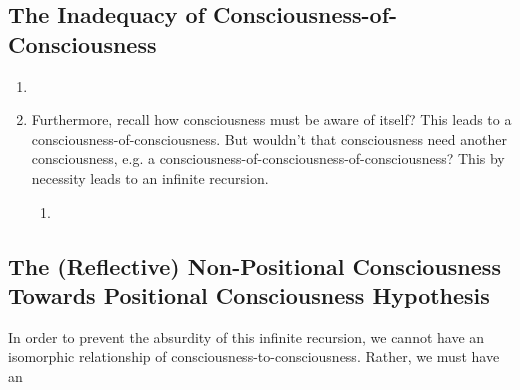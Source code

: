 \subsection{The Inadequacy of Consciousness-of-Consciousness}
\begin{enumerate}
  \item {}
  \item Furthermore, recall how consciousness must be aware of itself? This leads to a consciousness-of-consciousness. But wouldn't that consciousness need another consciousness, e.g. a consciousness-of-consciousness-of-consciousness? This by necessity leads to an infinite recursion.
  \begin{enumerate}
    \item {}
  \end{enumerate}
\end{enumerate}

\subsection{The (Reflective) Non-Positional Consciousness Towards Positional Consciousness Hypothesis}
In order to prevent the absurdity of this infinite recursion, we cannot have an isomorphic relationship of consciousness-to-consciousness. Rather, we must have an 

